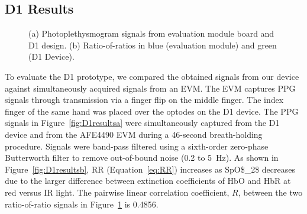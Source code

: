 \subsection{D1 Results}
\begin{figure}
    \begin{center}
    \end{center}
    \caption{(a) Photoplethysmogram signals from evaluation module board and D1 design. (b) Ratio-of-ratios in blue (evaluation module) and green (D1 Device).} 
    \label{fig:D1results}
\end{figure}
To evaluate the D1 prototype, we compared the obtained signals from our device against simultaneously acquired signals from an \ac{EVM}. The \ac{EVM} captures \ac{PPG} signals through transmission via a finger flip on the middle finger. The index finger of the same hand was placed over the optodes on the D1 device. The \ac{PPG} signals in Figure~\ref{fig:D1resultsa} were simultaneously captured from the D1 device and from the \ac{AFE4490} \ac{EVM} during a 46-second breath-holding procedure. Signals were band-pass filtered using a sixth-order zero-phase Butterworth filter to remove out-of-bound noise (0.2 to 5~Hz). As shown in Figure~\ref{fig:D1resultsb}, \ac{RR} (Equation~\ref{eq:RR}) increases as \ac{SpO$_2$} decreases due to the larger difference between extinction coefficients of \ac{HbO} and \ac{HbR} at red versus \ac{IR} light. The pairwise linear correlation coefficient, $R$, between the two ratio-of-ratio signals in Figure~\ref{fig:D1results} is 0.4856. 



